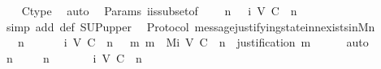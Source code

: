 \begin{isabellebody}
%
\isadelimproof
\ \ %
\endisadelimproof
%
\isatagproof
{}\isamarkupfalse%
\ C{\isacharunderscore}type\ \isamarkupfalse%
\ auto%
\endisatagproof
{\isafoldproof}%
%
\isadelimproof
\isanewline
%
\endisadelimproof
\isanewline
{}\isamarkupfalse%
\ {\isacharparenleft}\ Params{\isacharparenright}\ {\isasymSigma}i{\isacharunderscore}is{\isacharunderscore}subset{\isacharunderscore}of{\isacharunderscore}{\isasymSigma}\ {\isacharcolon}\isanewline
\ \ {\isachardoublequoteopen}{\isasymforall}\ n\ {\isasymin}\ {\isasymnat}{\isachardot}\ {\isasymSigma}{\isacharunderscore}i\ {\isacharparenleft}V{\isacharcomma}\ C{\isacharcomma}\ {\isasymepsilon}{\isacharparenright}\ n\ {\isasymsubseteq}\ {\isasymSigma}{\isachardoublequoteclose}\isanewline
%
\isadelimproof
\ \ %
\endisadelimproof
%
\isatagproof
{}\isamarkupfalse%
\ {\isacharparenleft}simp\ add{\isacharcolon}\ {\isasymSigma}{\isacharunderscore}def\ SUP{\isacharunderscore}upper{\isacharparenright}%
\endisatagproof
{\isafoldproof}%
%
\isadelimproof
\isanewline
%
\endisadelimproof
\isanewline
{}\isamarkupfalse%
\ {\isacharparenleft}\ Protocol{\isacharparenright}\ message{\isacharunderscore}justifying{\isacharunderscore}state{\isacharunderscore}in{\isacharunderscore}{\isasymSigma}{\isacharunderscore}n{\isacharunderscore}exists{\isacharunderscore}in{\isacharunderscore}M{\isacharunderscore}n\ {\isacharcolon}\isanewline
\ \ {\isachardoublequoteopen}{\isasymforall}\ n\ {\isasymin}\ {\isasymnat}{\isachardot}\ {\isacharparenleft}{\isasymforall}\ {\isasymsigma}{\isachardot}\ {\isasymsigma}\ {\isasymin}\ {\isasymSigma}{\isacharunderscore}i\ {\isacharparenleft}V{\isacharcomma}\ C{\isacharcomma}\ {\isasymepsilon}{\isacharparenright}\ n\ {\isasymlongrightarrow}\ {\isacharparenleft}{\isasymexists}\ m{\isachardot}\ m\ {\isasymin}\ M{\isacharunderscore}i\ {\isacharparenleft}V{\isacharcomma}\ C{\isacharcomma}\ {\isasymepsilon}{\isacharparenright}\ n\ {\isasymand}\ justification\ m\ {\isacharequal}\ {\isasymsigma}{\isacharparenright}{\isacharparenright}{\isachardoublequoteclose}\isanewline
%
\isadelimproof
\ \ %
\endisadelimproof
%
\isatagproof
{}\isamarkupfalse%
\ auto\isanewline
{}\isamarkupfalse%
\ {\isacharminus}\isanewline
\ \ \isamarkupfalse%
\ n\ {\isasymsigma}\isanewline
\ \ \isamarkupfalse%
\ {\isachardoublequoteopen}n\ {\isasymin}\ {\isasymnat}{\isachardoublequoteclose}\isanewline
\ \ \ {\isachardoublequoteopen}{\isasymsigma}\ {\isasymin}\ {\isasymSigma}{\isacharunderscore}i\ {\isacharparenleft}V{\isacharcomma}\ C{\isacharcomma}\ {\isasymepsilon}{\isacharparenright}\ n{\isachardoublequoteclose}\isanewline

\end{isabellebody}
